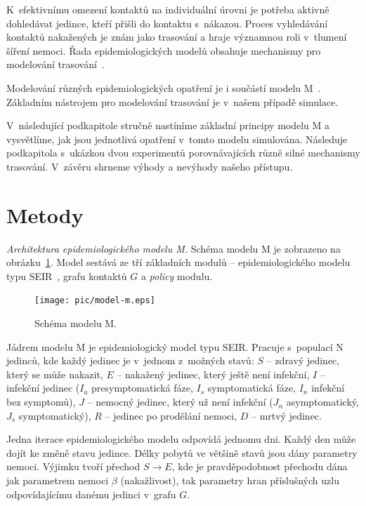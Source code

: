 K~efektivnímu omezení kontaktů na individuální úrovni je potřeba
aktivně dohledávat jedince, kteří přišli do kontaktu s~nákazou. Proces
vyhledávání kontaktů nakažených je znám jako trasování a hraje
významnou roli v~tlumení šíření nemoci. Řada epidemiologických modelů
obsahuje mechanismy pro modelování
trasování~\cite{pg:mooney2020,pg:kucharski2020,pg:Kerr2020,pg:keeling2020,pg:bilinski2020}.


Modelování různých epidemiologických opatření je i součástí 
modelu M~\cite{M-techrep2021}. Základním nástrojem pro modelování trasování je v~našem případě simulace.

V~následující podkapitole stručně nastíníme základní principy modelu M
a vysvětlíme, jak jsou jednotlivá opatření v~tomto modelu
simulována. Následuje podkapitola s~ukázkou dvou experimentů
porovnávajících různě silné mechanismy trasování. V~závěru shrneme
výhody a nevýhody našeho přístupu.


\section*{Metody}

\emph{Architektura epidemiologického modelu M.} Schéma modelu M je zobrazeno na obrázku~\ref{pg:fig:mm}. Model sestává ze
tří základních modulů -- epidemiologického modelu typu
SEIR~\cite{pg:bailey1975}, grafu kontaktů $G$ a {\em policy} modulu.

\begin{figure}[ht]
  \centering
  \texttt{[image: pic/model-m.eps]}
  \caption{Schéma modelu M.}
  \label{pg:fig:mm}
\end{figure}



Jádrem modelu M je epidemiologický model typu SEIR. Pracuje s~populací N
jedinců, kde každý jedinec je v~jednom z~možných stavů: $S$ -- zdravý jedinec,
který se může nakazit, $E$ -- nakažený jedinec, který ještě není infekční, $I$ --
infekční jedinec ($I_a$ presymptomatická fáze, $I_s$ symptomatická fáze, $I_n$
infekční bez symptomů),  $J$ -- nemocný jedinec, který už není infekční ($J_n$
asymptomatický, $J_s$ symptomatický), $R$ -- jedinec po prodělání nemoci, $D$ --
mrtvý jedinec.

Jedna iterace epidemiologického modelu odpovídá jednomu dni. Každý den
může dojít ke změně stavu jedince. Délky pobytů ve většině stavů jsou
dány parametry nemoci. Výjimku tvoří přechod $S \rightarrow E$, kde
je pravděpodobnost přechodu dána jak parametrem nemoci $\beta$
(nakažlivost), tak parametry hran příslušných uzlu odpovídajícímu
danému jedinci v~grafu $G$.

